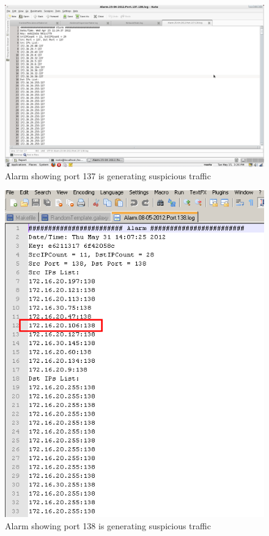 \documentclass{report}
\begin{document}
\begin{figure}[here]
\centering
\includegraphics[width=\textwidth]{Port137Alarm.png}
\caption{Alarm showing port 137 is generating suspicious traffic}
\label{Port137Alarm}
\end{figure}

\begin{figure}[here]
\centering
\includegraphics[width=\textwidth]{Port138Alarm.png}
\caption{Alarm showing port 138 is generating suspicious traffic}
\label{Port138Alarm}
\end{figure}
\end{document}
